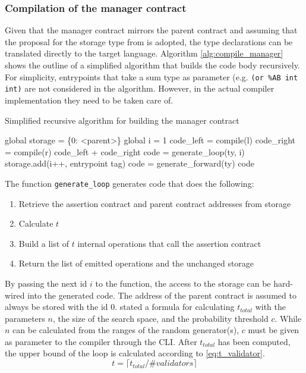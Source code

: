 \subsubsection{Compilation of the manager contract}
Given that the manager contract mirrors the parent contract and assuming that the proposal for the storage type from  is adopted, the type declarations can be translated directly to the target language. Algorithm \ref{alg:compile_manager} shows the outline of a simplified algorithm that builds the code body recursively. For simplicity, entrypoints that take a sum type as parameter (e.g. \texttt{(or \%AB int int)} are not considered in the algorithm. However, in the actual compiler implementation they need to be taken care of. 
\begin{algorithm}
\caption{Simplified recursive algorithm for building the manager contract}\label{alg:compile_manager}
	\begin{algorithmic}[0]
	\State global storage = \{0: <parent>\} 
	\State global i = 1 
	\State code\_left = compile(l)
	\State code\_right = compile(r)
	\State \Return code\_left + code\_right
	\Else
	\State code = generate\_loop(ty, i)
	\State storage.add(i++, entrypoint tag)
	\Else
	\State code = generate\_forward(ty)
	\EndIf
	\State \Return code
	\EndIf
	\EndFunction
	\end{algorithmic}
\end{algorithm}

The function \texttt{generate\_loop} generates code that does the following:
\begin{enumerate}
\item Retrieve the assertion contract and parent contract addresses from storage
\item Calculate $t$
\item Build a list of $t$ internal operations that call the assertion contract
\item Return the list of emitted operations and the unchanged storage
\end{enumerate}
By passing the next id $i$ to the function, the access to the storage can be hard-wired into the generated code. The address of the parent contract is assumed to always be stored with the id 0.  stated a formula for calculating $t_{total}$ with the parameters $n$, the size of the search space, and the probability threshold $c$. While $n$ can be calculated from the ranges of the random generator(s), $c$ must be given as parameter to the compiler through the CLI. After $t_{total}$ has been computed, the upper bound of the loop is calculated according to \eqref{eq:t_validator}. 
\begin{equation}
t = \lceil t_{total} / \#validators \rceil
\end{equation}

